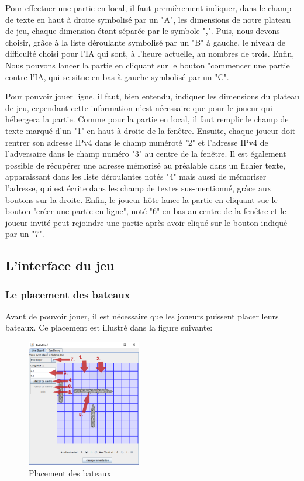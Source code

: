 		Pour effectuer une partie en local, il faut premièrement indiquer, dans le champ de texte en haut à droite symbolisé par un "A", les dimensions de notre plateau de jeu, chaque dimension étant séparée par le symbole ",". Puis, nous devons choisir, grâce à la liste déroulante symbolisé par un "B" à gauche, le niveau de difficulté choisi pour l'IA qui sont, à l'heure actuelle, au nombres de trois. Enfin, Nous pouvons lancer la partie en cliquant sur le bouton "commencer une partie contre l'IA, qui se situe en bas à gauche symbolisé par un "C".

		Pour pouvoir jouer ligne, il faut, bien entendu, indiquer les dimensions du plateau de jeu, cependant cette information n'est nécessaire que pour le joueur qui hébergera la partie. Comme pour la partie en local, il faut remplir le champ de texte marqué d'un "1" en haut à droite de la fenêtre. Ensuite, chaque joueur doit rentrer son adresse IPv4 dans le champ numéroté "2" et l'adresse IPv4 de l'adversaire dans le champ numéro "3" au centre de la fenêtre. \newline
Il est également possible de récupérer une adresse mémorisé au préalable dans un fichier texte, apparaissant dans les liste déroulantes notés "4" mais aussi de mémoriser l'adresse, qui est écrite dans les champ de textes sus-mentionné, grâce aux boutons sur la droite.
\newline
Enfin, le joueur hôte lance la partie en cliquant sue le bouton "créer une partie en ligne", noté "6" en bas au centre de la fenêtre et le joueur invité peut rejoindre une partie après avoir cliqué sur le bouton indiqué par un "7".

\subsection{L'interface du jeu}
	\subsubsection{Le placement des bateaux}
		Avant de pouvoir jouer, il est nécessaire que les joueurs puissent placer leurs bateaux. Ce placement est illustré dans la figure suivante: \newline
		\begin{figure}[!h]
			\centering
			\includegraphics [width=5cm]{images/ship_placement.png}
			\caption{Placement des bateaux}
		\end{figure}
	
